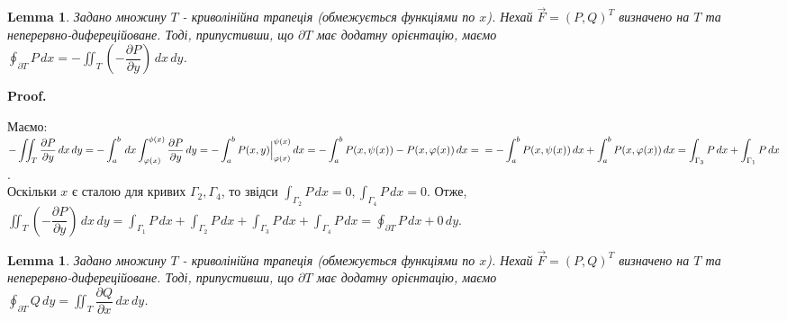\documentclass[a4paper, 10pt]{article}
\makeatletter
\def\departial#1#2{\dfrac{\partial {#1}}{\partial {#2}}}
\def\qed{$\blacksquare$}
\theoremstyle{theoremdd}
\theoremstyle{theoremdd}
\theoremstyle{theoremdd}
\theoremstyle{theoremdd}
\theoremstyle{theoremdd}
\theoremstyle{theoremdd}
\theoremstyle{theoremdd}
\newtheorem{lemma}[theorem]{Lemma}
\theoremstyle{theoremdd}
\renewenvironment{proof}[1][Proof.\\]{\par
\pushQED{\hfill \qed}%
\normalfont \topsep6\p@\@plus6\p@\relax
\trivlist
\item\relax
{\bfseries
#1\@addpunct{.}}\hspace\labelsep\ignorespaces
}{%
\popQED\endtrivlist\@endpefalse
}
\makeatother
\begin{document}
\begin{lemma}
Задано множину $T$ - криволінійна трапеція (обмежується функціями по $x$). Нехай $\vec{F} = (P,Q)^T$ визначено на $T$ та неперервно-дифереційоване. Тоді, припустивши, що $\partial  T$ має додатну орієнтацію, маємо\\
$\displaystyle\oint_{\partial T} P\,dx = -\iint_T \left( - \departial{P}{y} \right)\,dx\,dy$.
\end{lemma}

\begin{proof}
\begin{figure}[H]
\centering
{}
\end{figure}
Маємо:\\
$-\displaystyle\iint_T \departial{P}{y}\,dx\,dy = -\int_a^b\,dx \int_{\varphi(x)}^{\phi(x)} \departial{P}{y}\,dy =-\int_a^b P(x,y)\Big|_{\varphi(x)}^{\psi(x)}\,dx = -\int_a^b P(x,\psi(x))-P(x,\varphi(x))\,dx = \\
= -\int_a^b P(x,\psi(x))\,dx + \int_a^b P(x,\varphi(x))\,dx = \int_{\Gamma_3} P\,dx + \int_{\Gamma_1} P\,dx$.\\
Оскільки $x$ є сталою для кривих $\Gamma_2,\Gamma_4$, то звідси $\displaystyle\int_{\Gamma_2} P\,dx = 0, \int_{\Gamma_4} P\,dx = 0$. Отже,\\
$\displaystyle\iint_T \left( -\departial{P}{y} \right)\,dx\,dy = \int_{\Gamma_1} P\,dx + \int_{\Gamma_2} P\,dx + \int_{\Gamma_3} P\,dx + \int_{\Gamma_4} P\,dx = \oint_{\partial T}P\,dx + 0\,dy$.
\end{proof}

\begin{lemma}
Задано множину $T$ - криволінійна трапеція (обмежується функціями по $x$). Нехай $\vec{F} = (P,Q)^T$ визначено на $T$ та неперервно-дифереційоване. Тоді, припустивши, що $\partial  T$ має додатну орієнтацію, маємо\\
$\displaystyle\oint_{\partial T} Q\,dy = \iint_T \departial{Q}{x}\,dx\,dy$.
\end{lemma}
\end{document}
